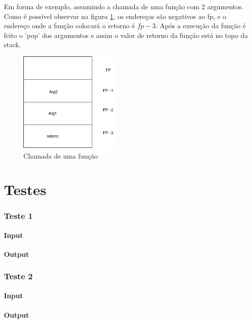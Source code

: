 \documentclass[a4paper,10pt]{report}
\begin{document}
Em forma de exemplo, assumindo a chamada de uma função com 2 argumentos. Como é possível observar na figura \ref{fig:functionStack}, os endereços são negativos ao fp, e o endereço onde a função colocará o retorno é $fp - 3$.
Após a execução da função é feito o 'pop' dos argumentos e assim o valor de retorno da função está no topo da stack. 

\begin{figure}
\centering
\includegraphics[width=5cm]{functionStack.png}
\caption{Chamada de uma função}
\label{fig:functionStack}
\end{figure}

\chapter{Testes}
\subsection{Teste 1}
\subsubsection{Input}

\subsubsection{Output}



\subsection{Teste 2}
\subsubsection{Input}

\subsubsection{Output}

\end{document}
